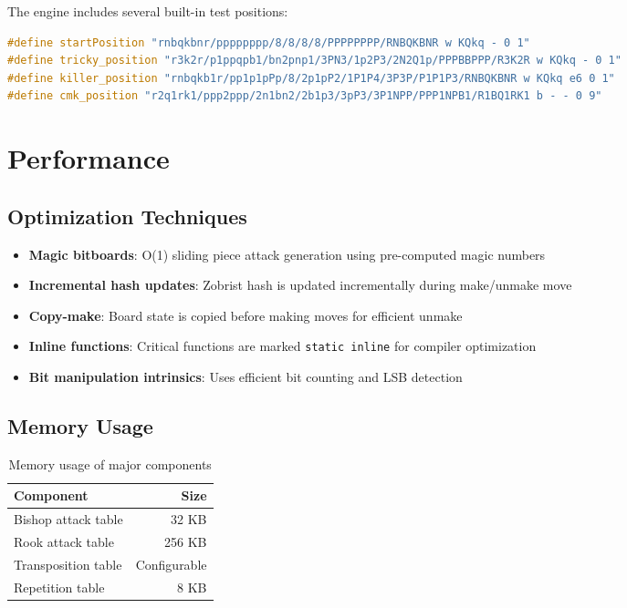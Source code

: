 \documentclass[11pt,a4paper]{report}
\begin{document}
The engine includes several built-in test positions:

\begin{lstlisting}[language=C++]
#define startPosition "rnbqkbnr/pppppppp/8/8/8/8/PPPPPPPP/RNBQKBNR w KQkq - 0 1"
#define tricky_position "r3k2r/p1ppqpb1/bn2pnp1/3PN3/1p2P3/2N2Q1p/PPPBBPPP/R3K2R w KQkq - 0 1"
#define killer_position "rnbqkb1r/pp1p1pPp/8/2p1pP2/1P1P4/3P3P/P1P1P3/RNBQKBNR w KQkq e6 0 1"
#define cmk_position "r2q1rk1/ppp2ppp/2n1bn2/2b1p3/3pP3/3P1NPP/PPP1NPB1/R1BQ1RK1 b - - 0 9"
\end{lstlisting}

\chapter{Performance}

\section{Optimization Techniques}

\begin{itemize}
    \item \textbf{Magic bitboards}: O(1) sliding piece attack generation using pre-computed magic numbers
    \item \textbf{Incremental hash updates}: Zobrist hash is updated incrementally during make/unmake move
    \item \textbf{Copy-make}: Board state is copied before making moves for efficient unmake
    \item \textbf{Inline functions}: Critical functions are marked \texttt{static inline} for compiler optimization
    \item \textbf{Bit manipulation intrinsics}: Uses efficient bit counting and LSB detection
\end{itemize}

\section{Memory Usage}

\begin{table}[h]
\centering
\begin{tabular}{lr}
\toprule
\textbf{Component} & \textbf{Size} \\
\midrule
Bishop attack table & 32 KB \\
Rook attack table & 256 KB \\
Transposition table & Configurable \\
Repetition table & 8 KB \\
\bottomrule
\end{tabular}
\caption{Memory usage of major components}
\end{table}
\end{document}
